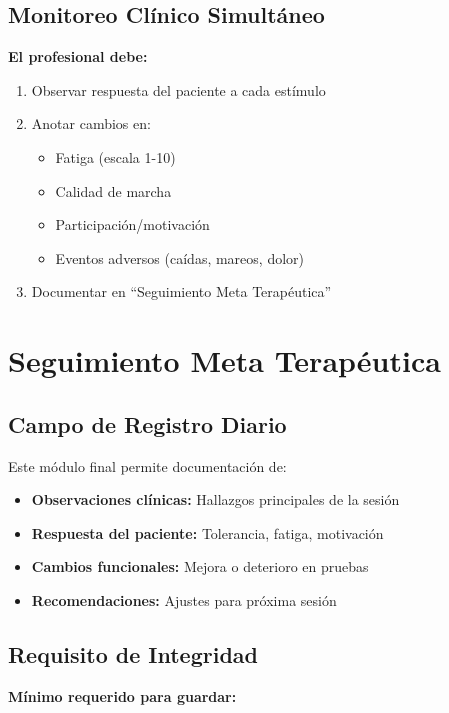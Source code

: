 \documentclass[12pt,a4paper,spanish,oneside]{book}
\begin{document}
\subsection{Monitoreo Clínico Simultáneo}

\textbf{El profesional debe:}

\begin{enumerate}
  \item Observar respuesta del paciente a cada estímulo
  \item Anotar cambios en:
  \begin{itemize}
    \item Fatiga (escala 1-10)
    \item Calidad de marcha
    \item Participación/motivación
    \item Eventos adversos (caídas, mareos, dolor)
  \end{itemize}
  \item Documentar en ``Seguimiento Meta Terapéutica''
\end{enumerate}

\section{Seguimiento Meta Terapéutica}

\subsection{Campo de Registro Diario}

Este módulo final permite documentación de:

\begin{itemize}
  \item \textbf{Observaciones clínicas:} Hallazgos principales de la sesión
  \item \textbf{Respuesta del paciente:} Tolerancia, fatiga, motivación
  \item \textbf{Cambios funcionales:} Mejora o deterioro en pruebas
  \item \textbf{Recomendaciones:} Ajustes para próxima sesión
\end{itemize}

\subsection{Requisito de Integridad}

\textbf{Mínimo requerido para guardar:}
\end{document}
